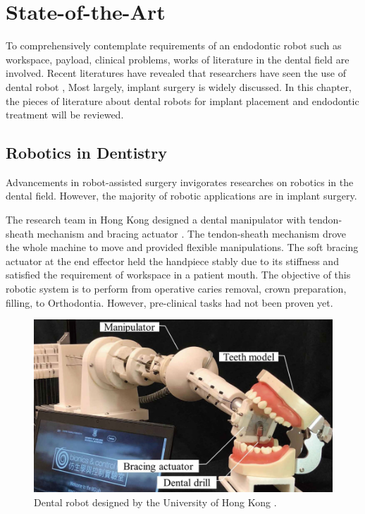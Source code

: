 \chapter{State-of-the-Art}
\hspace*{6mm}To comprehensively contemplate requirements of an endodontic robot such as workspace, payload, clinical problems, works of literature in the dental field are involved. Recent literatures have revealed that researchers have seen the use of dental robot \cite{rawtiya2014application}\cite{s21103308}\cite{bhat2017robotics}, Most largely, implant surgery is widely discussed\cite{haidar2017autonomous}\cite{wu2019robotics}. In this chapter, the pieces of literature about dental robots for implant placement and endodontic treatment will be reviewed.
\section{Robotics in Dentistry}
\hspace*{6mm}Advancements in robot-assisted surgery invigorates researches on robotics in the dental field. However, the majority of robotic applications are in implant surgery. 
\par
The research team in Hong Kong designed a dental manipulator with tendon-sheath mechanism and bracing actuator \cite{Li2019ACD}. The tendon-sheath mechanism drove the whole machine to move and provided flexible manipulations. The soft bracing actuator at the end effector held the handpiece stably due to its stiffness and satisfied the requirement of workspace in a patient mouth. The objective of this robotic system is to perform from operative caries removal, crown preparation, filling, to Orthodontia. However, pre-clinical tasks had not been proven yet.
\begin{figure}[htbp]
\begin{center}
\includegraphics[width=0.9\linewidth]{Images/hongkong_1.png}
\caption[Dental robot designed by the University of Hong Kong]{
Dental robot designed by the University of Hong Kong \cite{Li2019ACD}.
}\label{fig:hongkong}
\end{center}
\end{figure}
